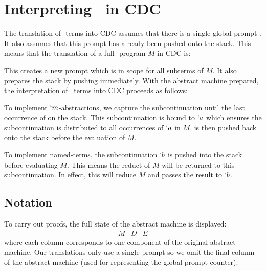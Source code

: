 
\section{Interpreting \lmu\ in CDC}\label{sec:lmu-in-cdc}


The translation of \lmu-terms into CDC assumes that there is a single global prompt \gp. 
It also assumes that this prompt has already been pushed onto the stack.
This means that the translation of a full \lmu-program $M$ in CDC is:

This creates a new prompt \gp which is in scope for all subterms of $M$.
It also prepares the stack by pushing \gp immediately. 
With the abstract machine prepared, 
the interpretation of \lmu\ terms into CDC proceeds as follows:


To implement $`m$-abstractions, we capture the subcontinuation until the last occurrence of \gp on the stack.
This subcontinuation is bound to $`a$ which ensures the subcontinuation is distributed to all occurrences of $`a$ in $M$.
\gp is then pushed back onto the stack before the evaluation of $M$.

To implement named-terms, the subcontinuation $`b$ is pushed into the stack before evaluating $M$.
This means the reduct of $M$ will be returned to this subcontinuation.
In effect, this will reduce $M$ and passes the result to $`b$.

\subsection{Notation}
To carry out proofs, the full state of the abstract machine is displayed:
\[
\begin{array}{lll}
  M & D & E
\end{array}
\]
where each column corresponds to one component of the original abstract machine.
Our translations only use a single prompt so we omit the final column of the abstract machine 
(used for representing the global prompt counter).

